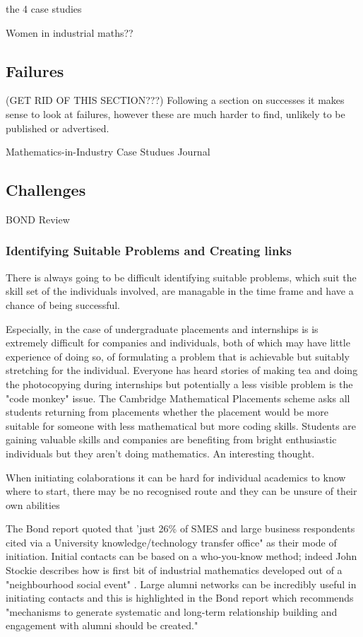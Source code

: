 \documentclass[11pt]{article} %
\begin{document}
	the 4 case studies 
	
	Women in industrial maths?? 
	
	\subsection{Failures} (GET RID OF THIS SECTION???)
	Following a section on successes it makes sense to look at failures, however these are much harder to find, unlikely to be published or advertised. 
	
	Mathematics-in-Industry Case Studues Journal 
	
	\subsection{Challenges} 
	BOND Review
	
	\subsubsection{Identifying Suitable Problems and Creating links} 
	
	There is always going to be difficult identifying suitable problems, which suit the skill set of the individuals involved, are managable in the time frame and have a chance of being successful. 
	
	Especially, in the case of undergraduate placements and internships is is extremely difficult for companies and individuals, both of which may have little experience of doing so, of formulating a problem that is achievable but suitably stretching for the individual. Everyone has heard stories of making tea and doing the photocopying during internships but potentially a less visible problem is the "code monkey" issue. The Cambridge Mathematical Placements scheme asks all students returning from placements whether the placement would be more suitable for someone with less mathematical but more coding skills. Students are gaining valuable skills and companies are benefiting from bright enthusiastic individuals but they aren't doing mathematics. An interesting thought. 
	
	
	
	When initiating colaborations it can be hard for individual academics to know where to start, there may be  no recognised route and they can be  unsure of their own abilities 
	
	The Bond report quoted that 'just 26\% of SMES and large business respondents cited via a University knowledge/technology transfer office" as their mode of initiation. Initial contacts can be based on a who-you-know  method; indeed John Stockie describes how is first bit of industrial mathematics developed out of a  "neighbourhood social event" \cite{Stockie2015}. Large alumni networks can be incredibly useful in initiating contacts and this is highlighted in the Bond report \cite{Bond}  which recommends "mechanisms to generate systematic and long-term relationship building and engagement with alumni should be created."
	
\end{document}
